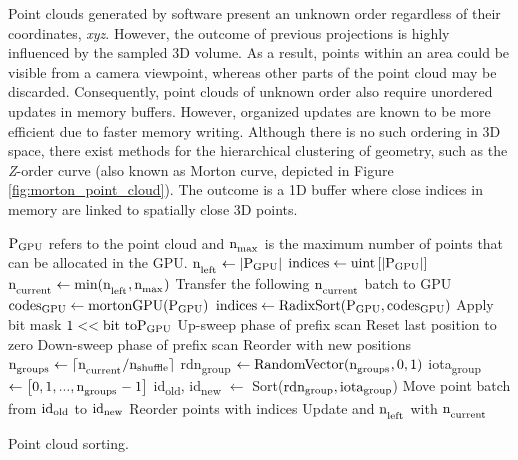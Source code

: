 Point clouds generated by software present an unknown order regardless of their coordinates, \textit{xyz}. However, the outcome of previous projections is highly influenced by the sampled 3D volume. As a result, points within an area could be visible from a camera viewpoint, whereas other parts of the point cloud may be discarded. Consequently, point clouds of unknown order also require unordered updates in memory buffers. However, organized updates are known to be more efficient due to faster memory writing. Although there is no such ordering in 3D space, there exist methods for the hierarchical clustering of geometry, such as the \textit{Z}-order curve (also known as Morton curve, depicted in Figure \ref{fig:morton_point_cloud}). The outcome is a 1D buffer where close indices in memory are linked to spatially close 3D points. 

\begin{algorithm}
  \begin{algorithmic}[1]
    \State $\textrm{P}\textsubscript{GPU}$ refers to the point cloud and $\textrm{n}_\textsubscript{max}$ is the maximum number of points that can be allocated in the GPU. %
    \State $\textrm{n}_\textsubscript{left} \gets |\textrm{P}\textsubscript{GPU}|$ %
    \State $\textrm{indices} \gets \textrm{uint}\left[|\textrm{P}\textsubscript{GPU}|\right]$ %
        \State $\textrm{n}_\textsubscript{current} \gets \textrm{min}(\textrm{n}_\textsubscript{left}, \textrm{n}_\textsubscript{max})$ %
        \State Transfer the following $\textrm{n}_\textsubscript{current}$ batch to GPU %
            \State $\textrm{codes}\textsubscript{GPU} \gets \textrm{mortonGPU}(\textrm{P}\textsubscript{GPU})$ %
            \State $\textrm{indices} \gets \textrm{RadixSort}(\textrm{P}\textsubscript{GPU}, \textrm{codes}\textsubscript{GPU})$ %
                    \State Apply bit mask $1 << \textrm{bit to} \textrm{P}\textsubscript{GPU}$ %
                    \State Up-sweep phase of prefix scan %
                    \State Reset last position to zero %
                    \State Down-sweep phase of prefix scan %
                    \State Reorder \Points with new positions %
                \EndFor
            \EndProcedure
        \EndProcedure
                \State $\textrm{n}_\textsubscript{groups} \gets \lceil \textrm{n}_\textsubscript{current} / \textrm{n}\textsubscript{shuffle} \rceil$ %
                \State rdn\textsubscript{group} $\gets \textrm{RandomVector}(\textrm{n}_\textsubscript{groups}, 0, 1)$ %
                \State iota\textsubscript{group} $\gets \bigl[0, 1, ..., \textrm{n}_\textsubscript{groups}-1 \bigr]$ %
                \State id\textsubscript{old}, id\textsubscript{new} $\gets$ Sort($\textrm{rdn\textsubscript{group}}, \textrm{iota}\textsubscript{group}$) %
                    \State Move point batch from $\textrm{id}\textsubscript{old}$ to $\textrm{id}\textsubscript{new}$ %
                \EndFor
            \Else
                \State Reorder points with indices %
            \EndIf
        \EndProcedure
        \State Update \Points \Space and $\textrm{n}_\textsubscript{left}$ with $\textrm{n}_\textsubscript{current}$ %
    \EndWhile
    \caption{Point cloud sorting.}
    \label{alg:sorting}
  \end{algorithmic}
\end{algorithm}

